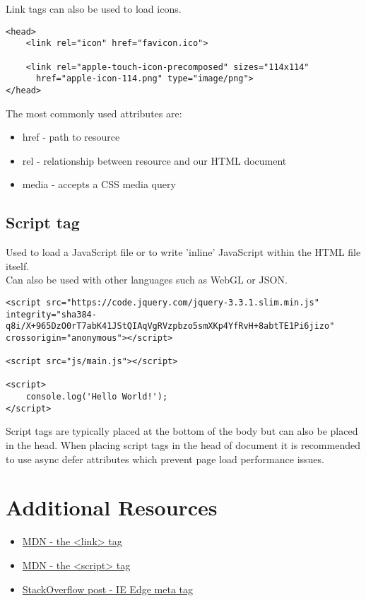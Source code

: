 Link tags can also be used to load icons.

\begin{verbatim}
<head>
    <link rel="icon" href="favicon.ico">

    <link rel="apple-touch-icon-precomposed" sizes="114x114"
      href="apple-icon-114.png" type="image/png">
</head>
\end{verbatim}

The most commonly used attributes are:

\begin{itemize}[leftmargin=*]
    \item href - path to resource
    \item rel - relationship between resource and our HTML document
    \item media - accepts a CSS media query
\end{itemize}

\subsection{Script tag}

Used to load a JavaScript file or to write 'inline' JavaScript within the HTML file itself.
\\

Can also be used with other languages such as WebGL or JSON.

\begin{verbatim}
<script src="https://code.jquery.com/jquery-3.3.1.slim.min.js" integrity="sha384-q8i/X+965DzO0rT7abK41JStQIAqVgRVzpbzo5smXKp4YfRvH+8abtTE1Pi6jizo" crossorigin="anonymous"></script>

<script src="js/main.js"></script>

<script>
    console.log('Hello World!');
</script>
\end{verbatim}

Script tags are typically placed at the bottom of the body but can also be placed in the head. When placing script tags in the head of document it is recommended to use async defer attributes which prevent page load performance issues.

\section{Additional Resources}

\begin{itemize}[leftmargin=*]
    \item \href{https://developer.mozilla.org/en-US/docs/Web/HTML/Element/link}{MDN - the <link> tag}
    \item \href{https://developer.mozilla.org/en-US/docs/Web/HTML/Element/script}{MDN - the <script> tag}
    \item \href{https://stackoverflow.com/questions/6771258/what-does-meta-http-equiv-x-ua-compatible-content-ie-edge-do}{StackOverflow post - IE Edge meta tag}
\end{itemize}